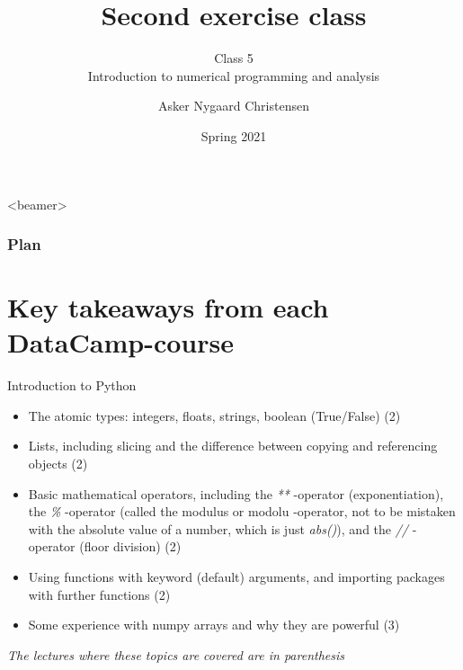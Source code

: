 \documentclass[10pt,danish,t,10pt]{beamer}
\title{Second exercise class \vspace{-2mm}}
\subtitle{Class 5 \\Introduction to numerical programming and analysis \vspace{-4mm} }
\author{Asker Nygaard Christensen}
\date{Spring 2021}
\makeatletter
\let\origtableofcontents=\tableofcontents
\def\tableofcontents{\@ifnextchar[{\origtableofcontents}{\gobbletableofcontents}}
\def\gobbletableofcontents#1{\origtableofcontents}
\newcommand{\code}[1]{\textit{#1}} %
\makeatother
\begin{document}
{
\begin{frame}

\maketitle


\end{frame}
}

\addtocounter{framenumber}{-1}

\begin{frame}<beamer>
\frametitle{Plan}

\tableofcontents[]
\end{frame}

\section{Key takeaways from each DataCamp-course}

\begin{frame}{Introduction to Python}
\begin{itemize}
    \item The atomic types: integers, floats, strings, boolean (True/False) (2)  
    \item Lists, including slicing and the difference between copying and referencing objects (2)
    \item Basic mathematical operators, including the \code{**} -operator (exponentiation), the \code{\%} -operator (called the modulus or modolu -operator, not to be mistaken with the absolute value of a number, which is just \code{abs()}), and the \code{//} -operator (floor division) (2)
    \item Using functions with keyword (default) arguments, and importing packages with further functions (2)
    \item Some experience with numpy arrays and why they are powerful (3)
\end{itemize}
\mbox{}
\vfill
\textit{The lectures where these topics are covered are in parenthesis} 

\end{frame}
\end{document}
